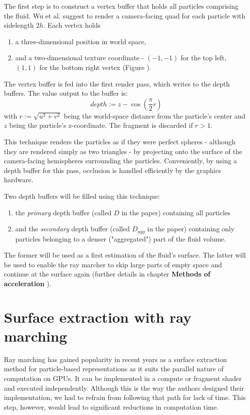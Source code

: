 The first step is to construct a vertex buffer that holds all particles comprising the fluid. Wu et al. suggest to render a camera-facing quad for each particle with sidelength $2h$. Each vertex holds
\begin{enumerate}
    \item a three-dimensional position in world space,
    \item and a two-dimensional texture coordinate - $(-1, -1)$ for the top left, $(1, 1)$ for the bottom right vertex (Figure ).
\end{enumerate}
The vertex buffer is fed into the first render pass, which writes to the depth buffers. The value output to the buffer is:
\[ depth := z - \cos(\frac{\pi}{2} r) \]
with $r := \sqrt{u^2 + v^2}$ being the world-space distance from the particle's center and $z$ being the particle's z-coordinate. The fragment is discarded if $r > 1$.

This technique renders the particles as if they were perfect spheres - although they are rendered simply as two triangles - by projecting onto the surface of the camera-facing hemispheres surrounding the particles. Conveniently, by using a depth buffer for this pass, occlusion is handled efficiently by the graphics hardware.

Two depth buffers will be filled using this technique:
\begin{enumerate}
    \item the \textit{primary} depth buffer (called $D$ in the paper) containing all particles
    \item and the \textit{secondary} depth buffer (called $D_{agg}$ in the paper) containing only particles belonging to a denser ("aggregated") part of the fluid volume.
\end{enumerate}
The former will be used as a first estimation of the fluid's surface. The latter will be used to enable the ray marcher to skip large parts of empty space and continue at the surface again (further details in chapter \textbf{Methods of acceleration }).


\section{Surface extraction with ray marching}
\label{sec:surfaceextraction}

Ray marching has gained popularity in recent years as a surface extraction method for particle-based representations as it suits the parallel nature of computation on GPUs. It can be implemented in a compute or fragment shader and executed independently. Although this is the way the authors designed their implementation, we had to refrain from following that path for lack of time. This step, however, would lead to significant reductions in computation time.

